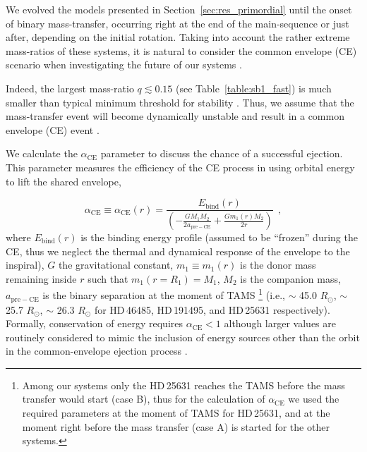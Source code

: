 \documentclass{aa}
\DeclareRobustCommand{\Tabref}[1]{Table~\ref{#1}}
\DeclareRobustCommand{\Secref}[1]{Section~\ref{#1}}
\begin{document}
We evolved the models presented in \Secref{sec:res_primordial}
  until the onset of binary mass-transfer, occurring right at the end
  of the main-sequence or just after, depending on the initial
  rotation. Taking into account the rather extreme mass-ratios of these systems, it is natural to consider
the common envelope (CE) scenario when investigating the future of our
systems \citep{paczynski:1976,claeys:14,renzo:21gwce}.

Indeed, the largest mass-ratio $q\lesssim0.15$ (see \Tabref{table:sb1_fast})
  is much smaller than typical minimum threshold for stability \citep[e.g.,
  $q\geq q_\mathrm{crit}\simeq0.25-0.625$ for main-sequence
  interactions,][]{claeys:14}. Thus, we assume that the mass-transfer
  event will become dynamically unstable and result in a common
  envelope (CE) event \citep{paczynski:1976, ivanova:2013, ivanova:2020,
    renzo:21gwce}.

We calculate the $\alpha_\mathrm{CE}$ parameter
  \citep{webbink:1984} to discuss the chance of a successful ejection.
  This parameter measures the efficiency of the CE process in using
  orbital energy to lift the shared envelope,

\begin{equation}
  \label{eq:alpha_CE}
  \alpha_\mathrm{CE} \equiv \alpha_\mathrm{CE}(r) = \frac{E_\mathrm{bind}(r)}{\left(-\frac{GM_1M_2}{2a_\mathrm{pre-CE}}+ \frac{Gm_1(r) M_2}{2r}\right)} \ \ ,
\end{equation}
where $E_\mathrm{bind}(r)$ is the binding energy profile (assumed
  to be ``frozen'' during the CE, thus we neglect the thermal and dynamical response of the envelope to the inspiral), $G$ the gravitational constant, $m_1\equiv m_1(r)$ is the donor mass remaining inside
$r$ such that $m_1(r=R_1)=M_1$, $M_2$ is the companion mass,
$a_\mathrm{pre-CE}$ is the binary separation at the moment of TAMS \footnote{Among our systems only the HD\,25631 reaches the TAMS before the mass transfer would start (case B), thus for the calculation of $\alpha_\mathrm{CE}$ we used the required parameters at the moment of TAMS for HD\,25631, and at the moment right before the mass transfer (case A)  is started for the other systems.} (i.e., $\sim$ 45.0 $R_{\odot}$, $\sim$ 25.7 $R_{\odot}$, $\sim$ 26.3 $R_{\odot}$ for HD\,46485, HD\,191495, and HD\,25631 respectively).
Formally, conservation of energy requires
  $\alpha_\mathrm{CE}<1$ \citep{Iaconi_2019} although larger
  values are routinely considered to mimic the inclusion of energy
  sources other than the orbit in the common-envelope ejection
  process \citep{Han_1995, ivanova:02, demarco:11, zorotovic:14}.
\end{document}
